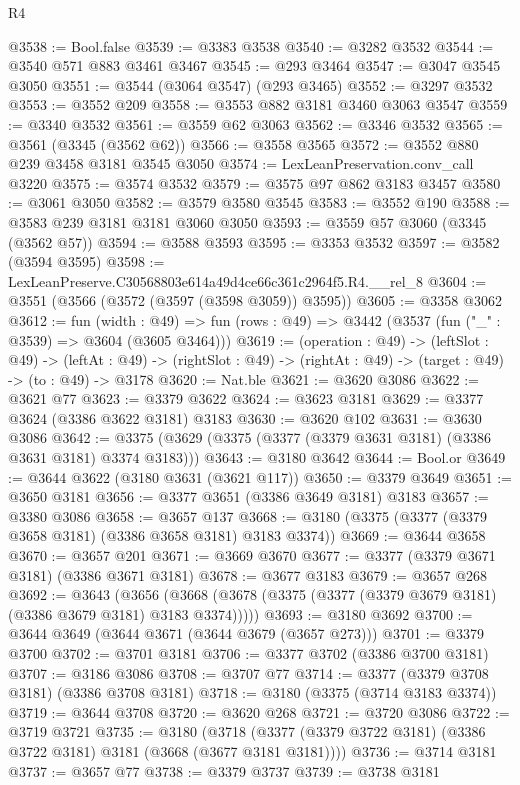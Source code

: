 \begin{lexlean}{R4}
\begin{coremodule}
@3538 := Bool.false
@3539 := @3383 @3538
@3540 := @3282 @3532
@3544 := @3540 @571 @883 @3461 @3467
@3545 := @293 @3464
@3547 := @3047 @3545 @3050
@3551 := @3544 (@3064 @3547) (@293 @3465)
@3552 := @3297 @3532
@3553 := @3552 @209
@3558 := @3553 @882 @3181 @3460 @3063 @3547
@3559 := @3340 @3532
@3561 := @3559 @62 @3063
@3562 := @3346 @3532
@3565 := @3561 (@3345 (@3562 @62))
@3566 := @3558 @3565
@3572 := @3552 @880 @239 @3458 @3181 @3545 @3050
@3574 := LexLeanPreservation.conv_call @3220
@3575 := @3574 @3532
@3579 := @3575 @97 @862 @3183 @3457
@3580 := @3061 @3050
@3582 := @3579 @3580 @3545
@3583 := @3552 @190
@3588 := @3583 @239 @3181 @3181 @3060 @3050
@3593 := @3559 @57 @3060 (@3345 (@3562 @57))
@3594 := @3588 @3593
@3595 := @3353 @3532
@3597 := @3582 (@3594 @3595)
@3598 := LexLeanPreserve.C30568803e614a49d4ce66c361c2964f5.R4.__rel_8
@3604 := @3551 (@3566 (@3572 (@3597 (@3598 @3059)) @3595))
@3605 := @3358 @3062
@3612 := fun (width : @49) =>
  fun (rows : @49) => @3442 (@3537 (fun ("_" : @3539) => @3604 (@3605 @3464)))
@3619 := (operation : @49) ->
  (leftSlot : @49) ->
  (leftAt : @49) -> (rightSlot : @49) -> (rightAt : @49) -> (target : @49) -> (to : @49) -> @3178
@3620 := Nat.ble
@3621 := @3620 @3086
@3622 := @3621 @77
@3623 := @3379 @3622
@3624 := @3623 @3181
@3629 := @3377 @3624 (@3386 @3622 @3181) @3183
@3630 := @3620 @102
@3631 := @3630 @3086
@3642 := @3375 (@3629 (@3375 (@3377 (@3379 @3631 @3181) (@3386 @3631 @3181) @3374 @3183)))
@3643 := @3180 @3642
@3644 := Bool.or
@3649 := @3644 @3622 (@3180 @3631 (@3621 @117))
@3650 := @3379 @3649
@3651 := @3650 @3181
@3656 := @3377 @3651 (@3386 @3649 @3181) @3183
@3657 := @3380 @3086
@3658 := @3657 @137
@3668 := @3180 (@3375 (@3377 (@3379 @3658 @3181) (@3386 @3658 @3181) @3183 @3374))
@3669 := @3644 @3658
@3670 := @3657 @201
@3671 := @3669 @3670
@3677 := @3377 (@3379 @3671 @3181) (@3386 @3671 @3181)
@3678 := @3677 @3183
@3679 := @3657 @268
@3692 := @3643
    (@3656 (@3668 (@3678 (@3375 (@3377 (@3379 @3679 @3181) (@3386 @3679 @3181) @3183 @3374)))))
@3693 := @3180 @3692
@3700 := @3644 @3649 (@3644 @3671 (@3644 @3679 (@3657 @273)))
@3701 := @3379 @3700
@3702 := @3701 @3181
@3706 := @3377 @3702 (@3386 @3700 @3181)
@3707 := @3186 @3086
@3708 := @3707 @77
@3714 := @3377 (@3379 @3708 @3181) (@3386 @3708 @3181)
@3718 := @3180 (@3375 (@3714 @3183 @3374))
@3719 := @3644 @3708
@3720 := @3620 @268
@3721 := @3720 @3086
@3722 := @3719 @3721
@3735 := @3180
    (@3718 (@3377 (@3379 @3722 @3181) (@3386 @3722 @3181) @3181 (@3668 (@3677 @3181 @3181))))
@3736 := @3714 @3181
@3737 := @3657 @77
@3738 := @3379 @3737
@3739 := @3738 @3181

\end{coremodule}
\end{lexlean}
